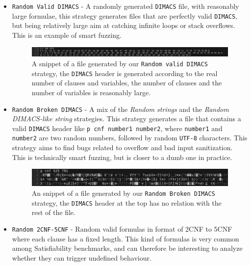 \documentclass{article}
\begin{document}
\begin{itemize}
		\item \verb|Random Valid DIMACS| - A randomly generated \texttt{DIMACS} file, with reasonably large formulae, this strategy generates files that are perfectly valid \texttt{DIMACS}, but being relatively large aim at catching infinite loops or stack overflows.
		This is an example of smart fuzzing.
		\begin{figure}[H]
			\centering
			\includegraphics[width=0.8\linewidth]{"random valid dimacs"}
			\caption{A snippet of a file generated by our \texttt{Random valid DIMACS} strategy, the \texttt{DIMACS} header is generated according to the real number of clauses and variables, the number of clauses and the number of variables is reasonably large.}
			\label{fig:random-dimacs}
		\end{figure}
	
		\item \verb|Random Broken DIMACS| - A mix of the \emph{Random strings} and the \emph{Random DIMACS-like string} strategies.
		This strategy generates a file that contains a valid \texttt{DIMACS} header like \texttt{p cnf number1 number2}, where \texttt{number1} and \texttt{number2} are two random numbers, followed by random \texttt{UTF-8} characters.
		This strategy aims to find bugs related to overflow and bad input sanitization. 
		This is technically smart fuzzing, but is closer to a dumb one in practice.
		\begin{figure}[H]
			\centering
			\includegraphics[width=0.8\linewidth]{"random broken dimacs"}
			\caption{An snippet of a file generated by our \texttt{Random Broken DIMACS} strategy, the \texttt{DIMACS} header at the top has no relation with the rest of the file.}
			\label{fig:random-broken-dimacs}
		\end{figure}
		
		\item \verb|Random 2CNF-5CNF| - Random valid formulas in format of 2CNF to 5CNF where each clause has a fixed length. This kind of formulas is very common among Satisfiability benchmarks, and can therefore be interesting to analyze whether they can trigger undefined behaviour.

\end{itemize}
\end{document}
